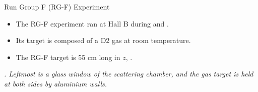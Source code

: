 \begin{frame}{Run Group F (RG-F) Experiment}
    \label{10.41::rgf_experiment}

    \begin{itemize}
        \item
            The RG-F experiment ran at Hall B during  and .

        \vspace{12pt}
        \item
            Its target is composed of a D2 gas at room temperature.

        \vspace{12pt}
        \item
            The RG-F target is 55 cm long in $z$, .
    \end{itemize}

    \vspace{-6pt}

    \begin{center}
        \begin{figure}[t]
        \end{figure}
    \end{center}

    \vspace{-6pt}

    \scriptsize{\textit{
        .
        Leftmost is a glass window of the scattering chamber, and the gas target is held at both sides by aluminium walls.
    }}
\end{frame}
